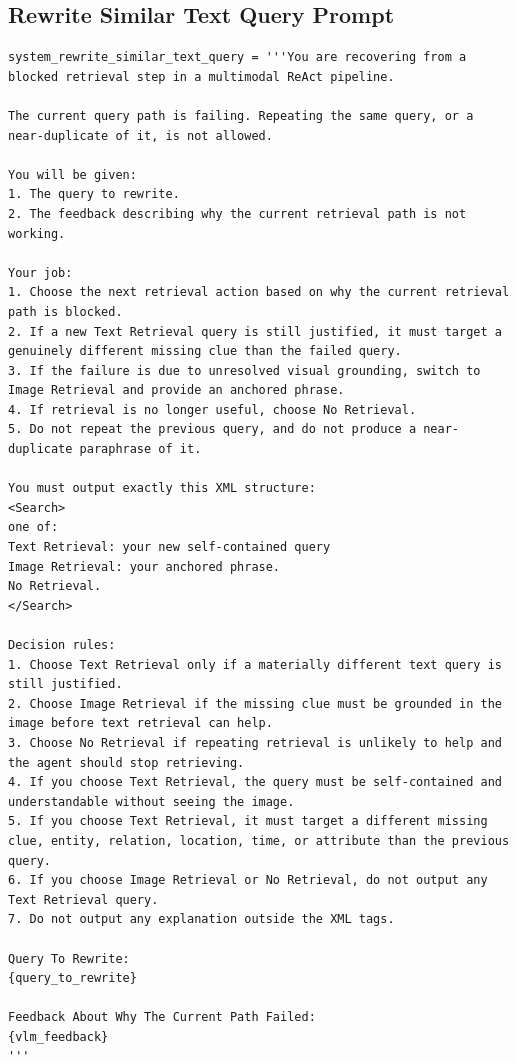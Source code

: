 \subsection{Rewrite Similar Text Query Prompt}
\begin{verbatim}
system_rewrite_similar_text_query = '''You are recovering from a blocked retrieval step in a multimodal ReAct pipeline.

The current query path is failing. Repeating the same query, or a near-duplicate of it, is not allowed.

You will be given:
1. The query to rewrite.
2. The feedback describing why the current retrieval path is not working.

Your job:
1. Choose the next retrieval action based on why the current retrieval path is blocked.
2. If a new Text Retrieval query is still justified, it must target a genuinely different missing clue than the failed query.
3. If the failure is due to unresolved visual grounding, switch to Image Retrieval and provide an anchored phrase.
4. If retrieval is no longer useful, choose No Retrieval.
5. Do not repeat the previous query, and do not produce a near-duplicate paraphrase of it.

You must output exactly this XML structure:
<Search>
one of:
Text Retrieval: your new self-contained query
Image Retrieval: your anchored phrase.
No Retrieval.
</Search>

Decision rules:
1. Choose Text Retrieval only if a materially different text query is still justified.
2. Choose Image Retrieval if the missing clue must be grounded in the image before text retrieval can help.
3. Choose No Retrieval if repeating retrieval is unlikely to help and the agent should stop retrieving.
4. If you choose Text Retrieval, the query must be self-contained and understandable without seeing the image.
5. If you choose Text Retrieval, it must target a different missing clue, entity, relation, location, time, or attribute than the previous query.
6. If you choose Image Retrieval or No Retrieval, do not output any Text Retrieval query.
7. Do not output any explanation outside the XML tags.

Query To Rewrite:
{query_to_rewrite}

Feedback About Why The Current Path Failed:
{vlm_feedback}
'''
\end{verbatim}

